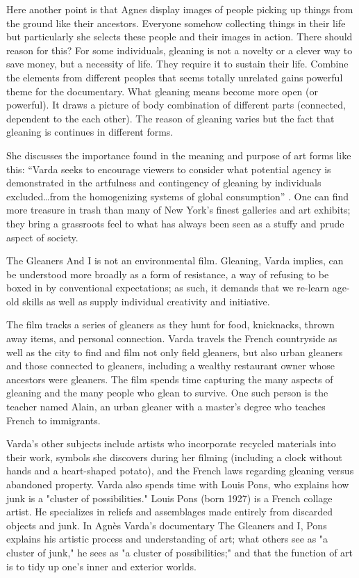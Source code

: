 \documentclass[12pt]{article}
\providecommand{\quotes}[1]{``#1''}
\begin{document}
Here another point is that Agnes display images of people picking up things from the ground like their ancestors. Everyone somehow collecting things in their life but particularly she selects these people and their images in action. There should reason for this? For some individuals, gleaning is not a novelty or a clever way to save money, but a necessity of life. They require it to sustain their life. Combine the elements from different peoples that seems totally unrelated gains powerful theme for the documentary. What gleaning means become more open (or powerful). It draws a picture of body combination of different parts (connected, dependent to the each other). The reason of gleaning varies but the fact that gleaning is continues in different forms.

She discusses the importance found in the meaning and purpose of art forms like this: \quotes{Varda seeks to encourage viewers to consider what potential agency is demonstrated in the artfulness and contingency of gleaning by individuals excluded\ldots from the homogenizing systems of global consumption} \cite{cruickshank2007work}. One can find more treasure in trash than many of New York’s finest galleries and art exhibits; they bring a grassroots feel to what has always been seen as a stuffy and prude aspect of society.

The Gleaners And I is not an environmental film. Gleaning, Varda implies, can be understood more broadly as a form of resistance, a way of refusing to be boxed in by conventional expectations; as such, it demands that we re-learn age-old skills as well as supply individual creativity and initiative.

The film tracks a series of gleaners as they hunt for food, knicknacks, thrown away items, and personal connection. Varda travels the French countryside as well as the city to find and film not only field gleaners, but also urban gleaners and those connected to gleaners, including a wealthy restaurant owner whose ancestors were gleaners. The film spends time capturing the many aspects of gleaning and the many people who glean to survive. One such person is the teacher named Alain, an urban gleaner with a master's degree who teaches French to immigrants.

Varda's other subjects include artists who incorporate recycled materials into their work, symbols she discovers during her filming (including a clock without hands and a heart-shaped potato), and the French laws regarding gleaning versus abandoned property. Varda also spends time with Louis Pons, who explains how junk is a "cluster of possibilities." Louis Pons (born 1927) is a French collage artist. He specializes in reliefs and assemblages made entirely from discarded objects and junk. In Agnès Varda's documentary The Gleaners and I, Pons explains his artistic process and understanding of art; what others see as "a cluster of junk," he sees as "a cluster of possibilities;" and that the function of art is to tidy up one's inner and exterior worlds.
\end{document}
